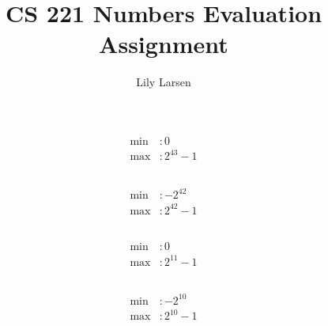 \documentclass{article}
\title{CS 221 Numbers Evaluation Assignment}
\author{Lily Larsen}
\begin{document}
\maketitle
\newpage

\section{}

\section{}

\section{}

\section{}

\section{}
\subsection{}
\begin{align*}
    \text{min}&: 0 \\
    \text{max}&: 2^{43} - 1
\end{align*}
\subsection{}
\begin{align*}
    \text{min}&: -2^{42} \\
    \text{max}&: 2^{42} - 1
\end{align*}
\subsection{}
\begin{align*}
    \text{min}&: 0 \\
    \text{max}&: 2^{11} - 1
\end{align*}
\subsection{}
\begin{align*}
    \text{min}&: -2^{10} \\
    \text{max}&: 2^{10} - 1
\end{align*}
\end{document}
